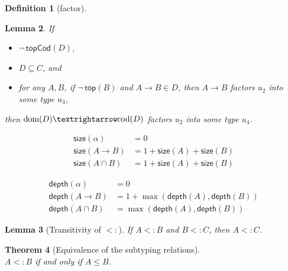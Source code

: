\documentclass{article}
\newtheorem{theorem}{Theorem}
\newtheorem{lemma}[theorem]{Lemma}
\newtheorem{definition}[theorem]{Definition}
\begin{document}
\begin{definition}[factor]

\end{definition}

\begin{lemma}
  If
\begin{itemize}
\item $\neg\, \mathsf{topCod}(D)$,
\item $D ⊆ C$, and
\item for any $A,B$, if $\neg\,\mathsf{top}(B)$ and $A → B ∈ D$,
     then $A → B$ factors $u_2$ into some type $u_3$,
\end{itemize}
then $\dom{D} → \cod{D}$ factors $u_2$ into some type $u_4$.
\end{lemma}

\begin{align*}
  \mathsf{size}(\alpha) &= 0 \\
  \mathsf{size}(A → B) &= 1 + \mathsf{size}(A) + \mathsf{size}(B) \\
  \mathsf{size}(A ∩ B) &= 1 + \mathsf{size}(A) + \mathsf{size}(B)
\end{align*}

\begin{align*}
  \mathsf{depth}(\alpha) &= 0 \\
  \mathsf{depth}(A → B) &= 1 + \max(\mathsf{depth}(A), \mathsf{depth}(B)) \\
  \mathsf{depth}(A ∩ B) &= \max(\mathsf{depth}(A), \mathsf{depth}(B))
\end{align*}

\begin{lemma}[Transitivity of $<:$]
    If $A <: B$ and $B <: C$, then $A <: C$.
\end{lemma}


\begin{theorem}[Equivalence of the subtyping relations]\ \\
  $A <: B$ if and only if $A ≤ B$.
\end{theorem}

\clearpage
\pagebreak



\end{document}
